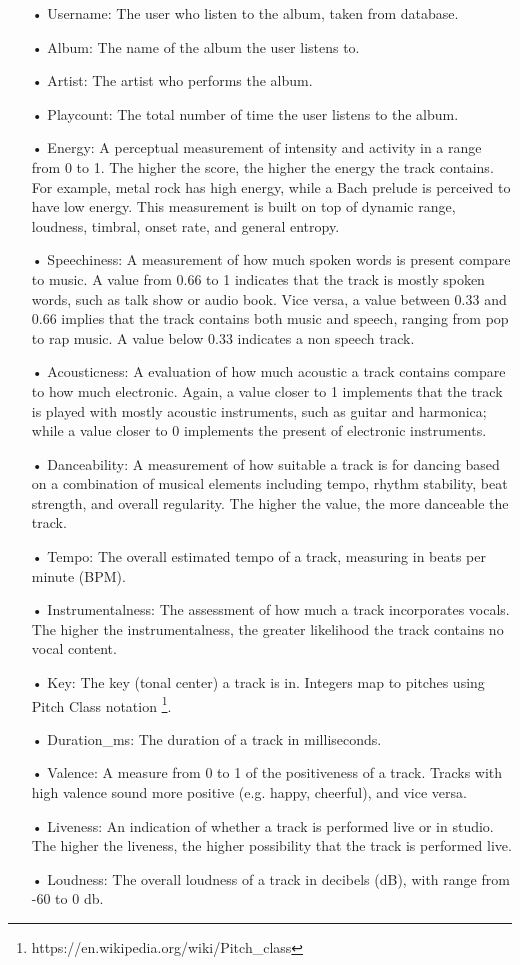 \begin{itemize}
\item[•] Username: The user who listen to the album, taken from  database.
\item[•] Album: The name of the album the user listens to.
\item[•] Artist: The artist who performs the album.
\item[•] Playcount: The total number of time the user listens to the album.
\item[•] Energy: A perceptual measurement of intensity and activity in a range from 0 to 1. The higher the score, the higher the energy the track contains. For example, metal rock has high energy, while a Bach prelude is perceived to have low energy. This measurement is built on top of dynamic range, loudness, timbral, onset rate, and general entropy.
\item[•] Speechiness: A measurement of how much spoken words is present compare to music. A value from 0.66 to 1 indicates that the track is mostly spoken words, such as talk show or audio book. Vice versa, a value between 0.33 and 0.66 implies that the track contains both music and speech, ranging from pop to rap music. A value below 0.33 indicates a non speech track. 
\item[•] Acousticness: A evaluation of how much acoustic a track contains compare to how much electronic. Again, a value closer to 1 implements that the track is played with mostly acoustic instruments, such as guitar and harmonica; while a value closer to 0 implements the present of electronic instruments.
\item[•] Danceability: A measurement of how suitable a track is for dancing based on a combination of musical elements including tempo, rhythm stability,  beat strength, and overall regularity. The higher the value, the more danceable the track.
\item[•] Tempo: The overall estimated tempo of a track, measuring in beats per minute (BPM).
\item[•] Instrumentalness: The assessment of how much a track incorporates vocals. The higher the instrumentalness, the greater likelihood the track contains no vocal content. 
\item[•] Key: The key (tonal center) a track is in. Integers map to pitches using Pitch Class notation \footnote{https://en.wikipedia.org/wiki/Pitch_class}. 
\item[•] Duration\_ms: The duration of a track in milliseconds.
\item[•] Valence: A measure from 0 to 1 of the positiveness of a track. Tracks with high valence sound more positive (e.g. happy, cheerful), and vice versa.
\item[•] Liveness: An indication of whether a track is performed live or in studio. The higher the liveness, the higher possibility that the track is performed live.
\item[•] Loudness: The overall loudness of a track in decibels (dB), with range from -60 to 0 db. 
\end{itemize}

